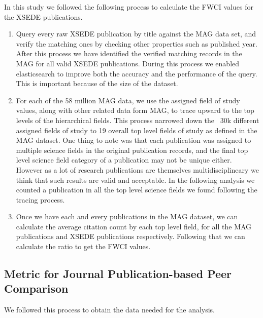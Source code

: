 \documentclass{sig-alternate}
\begin{document}
In this study we followed the following process to calculate the FWCI values for the
XSEDE publications.

\begin{enumerate}
\item Query every raw XSEDE publication by title against the MAG data set,
and verify the matching ones by checking other properties such as published year. After this
process we have identified the verified matching records in the MAG for all valid XSEDE publications.
During this process we enabled elasticsearch to improve both the accuracy and the performance
of the query.  This is important because of the size of the dataset.
\item For each of the 58 million MAG data, we use the assigned field of study values, along with other related data form MAG, to trace upward
to the top levels of the hierarchical fields. This process narrowed
down the ~30k different assigned fields of study to 19 overall top level fields of study as
defined in the MAG dataset.
One thing to note was that each publication was assigned to multiple science fields in the
original publication records, and the final top level science field category of a publication
may not be unique either. However as a lot of research publications are themselves
multidisciplineary we think that such results are valid and acceptable. In the following analysis
we counted a publication in all the top level science fields we found following the tracing process.
\item Once we have each and every publications in the MAG dataset, we can calculate the average
citation count by each top level field, for all the MAG publications and XSEDE publications
respectively. Following that we can calculate the ratio to get the FWCI values.
\end{enumerate}

\subsection{Metric for Journal Publication-based Peer Comparison} \label{S:metric}

We followed this process to obtain the data needed for the analysis.
\end{document}
